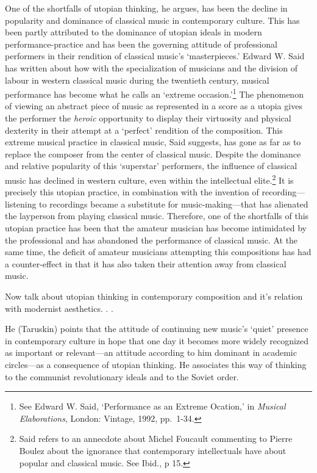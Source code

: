 One of the shortfalls of utopian thinking, he argues, has been the decline in popularity and dominance of classical  music in contemporary culture. This has been partly attributed to the dominance of utopian ideals in modern performance-practice and has been the governing attitude of professional performers in their rendition of classical music's `masterpieces.' Edward W. Said has written about how with the specialization of musicians and the division of labour in western classical music during the twentieth century, musical performance has become what he calls an `extreme occasion.'\footnote{See Edward W. Said, `Performance as an Extreme Ocation,' in \emph{Musical Elaborations}, London: Vintage, 1992, \mbox{pp. 1-34}.} The phenomenon of viewing an abstract piece of music as represented in a score as a utopia gives the performer the \emph{heroic} opportunity to display their virtuosity and physical dexterity in their attempt at a `perfect' rendition of the composition. This extreme musical practice in classical music, Said suggests, has gone as far as to replace the composer from the center of classical music. Despite the dominance and relative popularity of this `superstar' performers, the influence of classical music has declined in western culture, even within the intellectual elite.\footnote{Said refers to an annecdote about Michel Foucault commenting to Pierre Boulez about the ignorance that contemporary intellectuals have about popular and classical music. See Ibid., p 15.} It is precisely this utopian practice, in combination with the invention of recording---listening to recordings became a substitute for music-making---that has alienated the layperson from playing classical music. Therefore, one of the shortfalls of this utopian practice has been that the amateur musician has become intimidated by the professional and has abandoned the performance of classical music. At the same time, the deficit of amateur musicians attempting this compositions has had a counter-effect in that it has also taken their attention away from classical music.

Now talk about utopian thinking in contemporary composition and it's relation with modernist aesthetics. . . 
 
He (Taruskin) points that the attitude of continuing new music's `quiet' presence in contemporary culture in hope that one day it becomes more widely recognized as important or relevant---an attitude according to him dominant in academic circles---as a consequence of utopian thinking. He associates this way of thinking to the communist revolutionary ideals and to the Soviet order.


